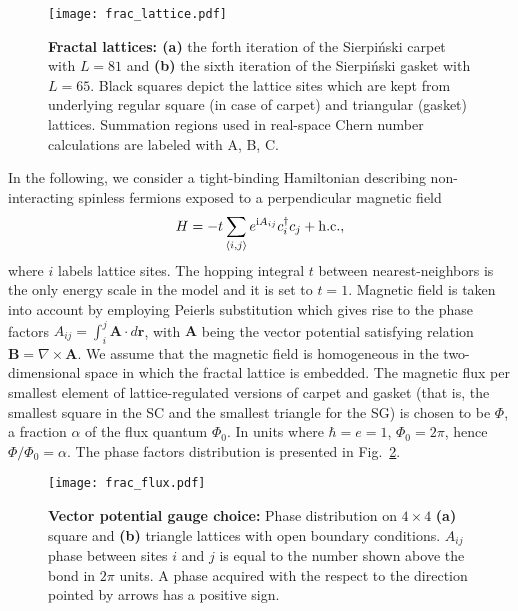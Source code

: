 {\begin{figure}[h]
\centering
\texttt{[image: frac\_lattice.pdf]}
\caption{\textbf{Fractal lattices: (a)} the forth iteration of the Sierpiński carpet with $L = 81$ and \textbf{(b)} the sixth iteration of the Sierpiński gasket with $L = 65$. Black squares depict the lattice sites which are kept from underlying regular square (in case of carpet) and triangular (gasket) lattices. Summation regions used in real-space Chern number calculations are labeled with A, B, C.}
\label{fig:lattice}
\end{figure}
In the following, we consider a tight-binding Hamiltonian describing non-interacting spinless fermions exposed to a perpendicular magnetic field 
\begin{equation}
H = -t  \sum_{\langle i, j \rangle} e^{\textnormal{i} A_{ij}} c^{\dagger}_i c_j + \mathrm{h.c.},
\label{eq:frac_ham}
\end{equation}
where $i$ labels lattice sites. The hopping integral $t$ between nearest-neighbors is the only energy scale in the model and it is set to $t = 1$. Magnetic field is taken into account by employing Peierls substitution which gives rise to the phase factors $A_{ij} = \int_i^j \mathbf{A} \cdot d \mathbf{r}$, with $\mathbf{A}$ being the vector potential satisfying relation $\mathbf{B} =  \nabla \times \mathbf{A}$. We assume that the magnetic field is homogeneous in the two-dimensional space in which the fractal lattice is embedded. The magnetic flux per smallest element of lattice-regulated versions of carpet and gasket (that is, the smallest square in the SC and the smallest triangle for the SG) is chosen to be $\Phi$,  a fraction $\alpha$ of the flux quantum $\Phi_0$. In units where $\hbar = e = 1$, $\Phi_0 = 2 \pi$, hence $\Phi  /  \Phi_0 = \alpha$. The phase factors distribution is presented in Fig.~\ref{fig:flux_distr}.

\begin{figure}
\centering
\texttt{[image: frac\_flux.pdf]} 
\caption{\textbf{Vector potential gauge choice:} Phase distribution on $4 \times 4$ \textbf{(a)} square and \textbf{(b)} triangle lattices with open boundary conditions. $A_{ij}$ phase between sites $i$ and $j$ is equal to the number shown above the bond in $2 \pi$ units. A phase acquired with the respect to the direction pointed by arrows has a positive sign.}
\label{fig:flux_distr}
\end{figure}


}
